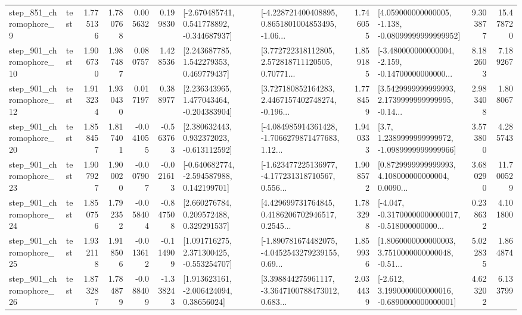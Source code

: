\begin{tabular}{llrrrrllrlrr}
   step\_851\_chromophore\_9 &      test &      1.775136 &    1.780768 &      0.005632 &  0.199830 &   [-2.670485741, 0.541778892, -0.344687937] &  [-4.228721400408895, 0.8651801004853495, -1.06... &       1.746055 &  [4.059000000000005, -1.138, -0.08099999999999952] &            9.303877 &         15.478720 \\
  step\_901\_chromophore\_10 &      test &      1.906730 &    1.987487 &      0.080757 &  1.428536 &     [2.243687785, 1.542279353, 0.469779437] &  [3.772722318112805, 2.572818711120505, 0.70771... &       1.859185 &  [-3.480000000000004, -2.159, -0.14700000000000... &            8.182603 &          7.189267 \\
  step\_901\_chromophore\_12 &      test &      1.913234 &    1.930430 &      0.017197 &  0.388977 &    [2.236343965, 1.477043464, -0.204383904] &  [3.727180852164283, 2.4467157402748274, -0.196... &       1.778459 &  [3.5429999999999993, 2.1739999999999995, -0.14... &            2.983408 &          1.808067 \\
  step\_901\_chromophore\_20 &      test &      1.858457 &    1.817401 &     -0.041055 & -0.563763 &    [2.380632443, 0.932372023, -0.613112592] &  [-4.084985914361428, -1.7066279871477683, 1.12... &       1.940333 &     [3.7, 1.2389999999999972, -1.0989999999999966] &            3.573800 &          4.285743 \\
  step\_901\_chromophore\_23 &      test &      1.907927 &    1.900020 &     -0.007907 & -0.021613 &   [-0.640682774, -2.594587988, 0.142199701] &  [-1.623477225136977, -4.177231318710567, 0.556... &       1.908572 &  [0.8729999999999993, 4.108000000000004, 0.0090... &            3.680290 &         11.700529 \\
  step\_901\_chromophore\_24 &      test &      1.850756 &    1.792352 &     -0.058404 & -0.847508 &     [2.660276784, 0.209572488, 0.329291537] &  [4.429699731764845, 0.4186206702946517, 0.2545... &       1.783298 &  [-4.047, -0.31700000000000017, -0.518000000000... &            0.238632 &          4.101800 \\
  step\_901\_chromophore\_25 &      test &      1.932118 &    1.918506 &     -0.013612 & -0.114909 &    [1.091716275, 2.371300425, -0.553254707] &  [-1.890781674482075, -4.0452543279239155, 0.69... &       1.859936 &  [1.8060000000000003, 3.7510000000000048, -0.51... &            5.022835 &          1.864874 \\
  step\_901\_chromophore\_26 &      test &      1.873287 &    1.784879 &     -0.088409 & -1.338243 &     [1.913623161, -2.006424094, 0.38656024] &  [3.398844275961117, -3.3647100788473012, 0.683... &       2.034439 &  [-2.612, 3.1990000000000016, -0.6890000000000001] &            4.623202 &          6.133799 \\

\end{tabular}
